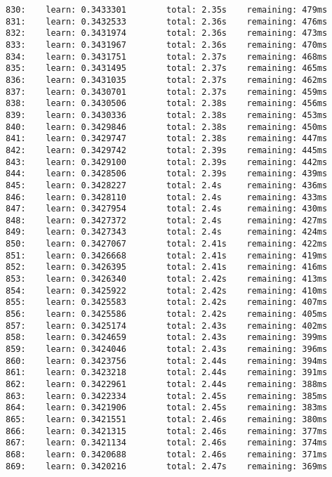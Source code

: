 \documentclass[11pt]{article}
\begin{document}
\begin{Verbatim}[commandchars=\\\{\}]
830:    learn: 0.3433301        total: 2.35s    remaining: 479ms
831:    learn: 0.3432533        total: 2.36s    remaining: 476ms
832:    learn: 0.3431974        total: 2.36s    remaining: 473ms
833:    learn: 0.3431967        total: 2.36s    remaining: 470ms
834:    learn: 0.3431751        total: 2.37s    remaining: 468ms
835:    learn: 0.3431495        total: 2.37s    remaining: 465ms
836:    learn: 0.3431035        total: 2.37s    remaining: 462ms
837:    learn: 0.3430701        total: 2.37s    remaining: 459ms
838:    learn: 0.3430506        total: 2.38s    remaining: 456ms
839:    learn: 0.3430336        total: 2.38s    remaining: 453ms
840:    learn: 0.3429846        total: 2.38s    remaining: 450ms
841:    learn: 0.3429747        total: 2.38s    remaining: 447ms
842:    learn: 0.3429742        total: 2.39s    remaining: 445ms
843:    learn: 0.3429100        total: 2.39s    remaining: 442ms
844:    learn: 0.3428506        total: 2.39s    remaining: 439ms
845:    learn: 0.3428227        total: 2.4s     remaining: 436ms
846:    learn: 0.3428110        total: 2.4s     remaining: 433ms
847:    learn: 0.3427954        total: 2.4s     remaining: 430ms
848:    learn: 0.3427372        total: 2.4s     remaining: 427ms
849:    learn: 0.3427343        total: 2.4s     remaining: 424ms
850:    learn: 0.3427067        total: 2.41s    remaining: 422ms
851:    learn: 0.3426668        total: 2.41s    remaining: 419ms
852:    learn: 0.3426395        total: 2.41s    remaining: 416ms
853:    learn: 0.3426340        total: 2.42s    remaining: 413ms
854:    learn: 0.3425922        total: 2.42s    remaining: 410ms
855:    learn: 0.3425583        total: 2.42s    remaining: 407ms
856:    learn: 0.3425586        total: 2.42s    remaining: 405ms
857:    learn: 0.3425174        total: 2.43s    remaining: 402ms
858:    learn: 0.3424659        total: 2.43s    remaining: 399ms
859:    learn: 0.3424046        total: 2.43s    remaining: 396ms
860:    learn: 0.3423756        total: 2.44s    remaining: 394ms
861:    learn: 0.3423218        total: 2.44s    remaining: 391ms
862:    learn: 0.3422961        total: 2.44s    remaining: 388ms
863:    learn: 0.3422334        total: 2.45s    remaining: 385ms
864:    learn: 0.3421906        total: 2.45s    remaining: 383ms
865:    learn: 0.3421551        total: 2.46s    remaining: 380ms
866:    learn: 0.3421315        total: 2.46s    remaining: 377ms
867:    learn: 0.3421134        total: 2.46s    remaining: 374ms
868:    learn: 0.3420688        total: 2.46s    remaining: 371ms
869:    learn: 0.3420216        total: 2.47s    remaining: 369ms

\end{Verbatim}
\end{document}
